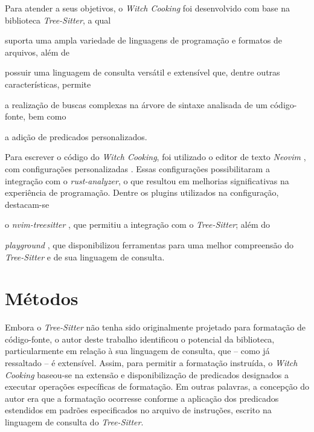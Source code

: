 \documentclass
  [11pt,a4paper,english,brazil,openright,sumario=tradicional,twoside]
  {abntex2}
\newcommand{\treesitter}{\textit{Tree-Sitter}\xspace}
\newcommand{\witchcooking}{\textit{Witch Cooking}\xspace}
\begin{document}
  Para atender a seus objetivos, o \witchcooking foi desenvolvido com base na
  biblioteca \treesitter \cite{tree-sitter-2018-tree}, a qual
  \begin{inparaenum}
    \item suporta uma ampla variedade de linguagens de programação e formatos
          de arquivos, além de
    \item possuir uma linguagem de consulta versátil e extensível que, dentre
          outras características, permite
          \begin{inparaenum}
            \item a realização de buscas complexas na árvore de sintaxe
                  analisada de um código-fonte, bem como
            \item a adição de predicados personalizados.
          \end{inparaenum}
  \end{inparaenum}

  Para escrever o código do \witchcooking, foi utilizado o editor de texto
  \textit{Neovim} \cite{neovim-2023-hyperextensible}, com configurações
  personalizadas \cite{silva-2023-uma}. Essas configurações possibilitaram a
  integração com o \textit{rust-analyzer}, o que resultou em melhorias
  significativas na experiência de programação. Dentre os plugins utilizados na
  configuração, destacam-se
  \begin{inparaenum}
    \item o \textit{nvim-treesitter} \cite{nvim-treesitter-2023-nvim}, que
          permitiu a integração com o \treesitter; além do
    \item \textit{playground} \cite{nvim-treesitter-2023-playground}, que
          disponibilizou ferramentas para uma melhor compreensão do \treesitter
          e de sua linguagem de consulta.
  \end{inparaenum}


  \section{Métodos}

  Embora o \treesitter não tenha sido originalmente projetado para formatação
  de código-fonte, o autor deste trabalho identificou o potencial da
  biblioteca, particularmente em relação à sua linguagem de consulta, que --
  como já ressaltado -- é extensível. Assim, para permitir a formatação
  instruída, o \witchcooking baseou-se na extensão e disponibilização de
  predicados designados a executar operações específicas de formatação. Em
  outras palavras, a concepção do autor era que a formatação ocorresse conforme
  a aplicação dos predicados estendidos em padrões especificados no arquivo de
  instruções, escrito na linguagem de consulta do \treesitter.
\end{document}
